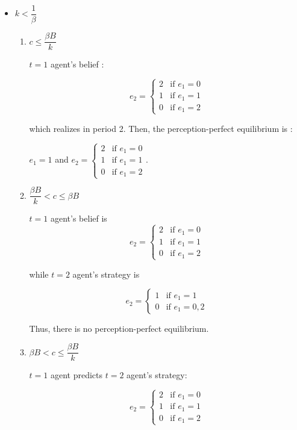 \documentclass{jsarticle}
\begin{document}
\begin{enumerate}
\begin{enumerate}
\begin{itemize}
\begin{enumerate}
 \end{enumerate}

\item $k<\dfrac{1}{\beta}$

 \begin{enumerate}
 
 \item $c \leq \dfrac{\beta B}{k}$
 
 $t=1$ agent's belief :
 
 \[e_2 = \begin{cases}
 2 & \text{if } e_1=0 \\
 1 & \text{if } e_1=1 \\
 0 & \text{if } e_1=2
 \end{cases} \]
 
 which realizes in period 2. Then, the perception-perfect equilibrium is :
 
 \begin{center}
 
 $e_1=1$ and $e_2 = \begin{cases}
 2 & \text{if } e_1=0 \\
 1 & \text{if } e_1=1 \\
 0 & \text{if } e_1=2
 \end{cases} $.
 
 \end{center}
 
 \item $\dfrac{\beta B}{k} < c \leq \beta B$
 
 $t=1$ agent's belief is
 \[e_2 = \begin{cases}
 2 & \text{if } e_1=0 \\
 1 & \text{if } e_1=1 \\
 0 & \text{if } e_1=2
 \end{cases} \]
 
 while $t=2$ agent's strategy is
 
 \[e_2 = \begin{cases}
 1 & \text{if } e_1=1 \\
 0 & \text{if } e_1=0,2
 \end{cases} \]
 
 Thus, there is no perception-perfect equilibrium.
 
 \item $\beta B < c \leq \dfrac{\beta B}{k}$
 
 $t=1$ agent predicts $t=2$ agent's strategy:
 
 \[e_2 = \begin{cases}
 2 & \text{if } e_1=0 \\
 1 & \text{if } e_1=1 \\
 0 & \text{if } e_1=2
 \end{cases} \]
 

\end{enumerate}
\end{itemize}
\end{enumerate}
\end{enumerate}
\end{document}
